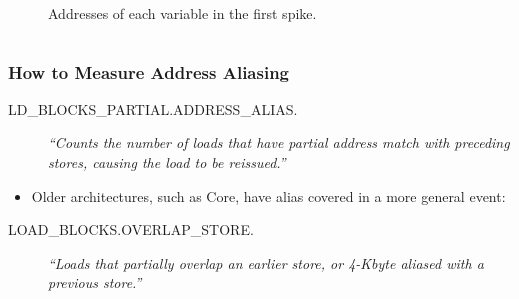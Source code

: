\documentclass{beamer}
\begin{document}
\begin{frame}
\begin{columns}[T]
\begin{column}{.50\textwidth}
\begin{figure}
\begin{tikzpicture}[font=\footnotesize]

  \end{tikzpicture}
  \caption{Addresses of each variable in the first spike.}
\end{figure}


\end{column}
\end{columns}

\end{frame}


\begin{frame}[fragile]
  \frametitle{How to Measure Address Aliasing}

  \begin{description}
    \item[{\small LD\_BLOCKS\_PARTIAL.ADDRESS\_ALIAS.}] 
    \emph{``Counts the number of loads that have partial address match with preceding stores, causing the load to be reissued.''} 
    \cite[B.3.4.4]{OptimizationManual}
  \end{description}

  \begin{itemize}
    \item Older architectures, such as Core, have alias covered in a more general event:
  \end{itemize}

  \begin{description}
    \item[{\small LOAD\_BLOCKS.OVERLAP\_STORE.}] 
    \emph{``Loads that partially overlap an earlier store, or 4-Kbyte aliased with a previous store.''} 
    \cite[Table 19-17]{Volume3B}
  \end{description}

\end{frame}
\end{document}
